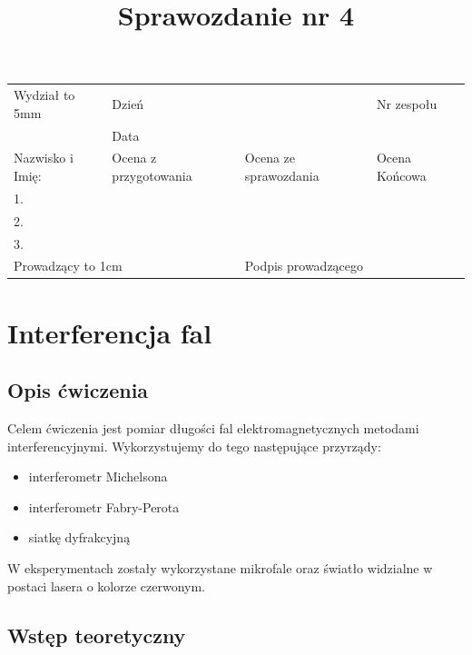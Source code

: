 \documentclass[a4paper]{article}
\title{Sprawozdanie nr 4}
\date{}
\newcommand{\Vsp}[1]{\vtop to #1 {}}
\newcommand{\Small}{\scriptsize}
\begin{document}
\begin{center}
\begin{tabular}{|p{5cm}|l|l|l|}
    \hline
    Wydział \Vsp{5mm} & \multicolumn{1}{|l}{Dzień} &  & Nr zespołu\\
    & \multicolumn{1}{|l}{Data} &  & \\
    \hline 
    Nazwisko i Imię: & \Small Ocena z przygotowania  & \Small Ocena ze sprawozdania & \Small Ocena Końcowa \\
    1. & & &\\
    2. & & & \\
    3. & & & \\
    \hline
    \multicolumn{2}{|l|}{Prowadzący \Vsp{1cm}} & \multicolumn{2}{|l|}{Podpis prowadzącego} \\
    \hline
\end{tabular}
\end{center}

{\let\newpage\relax\maketitle}  %
\setcounter{secnumdepth}{2}
\setcounter{tocdepth}{2}

\section{Interferencja fal} %

\subsection{Opis ćwiczenia}

Celem ćwiczenia jest pomiar długości fal elektromagnetycznych metodami interferencyjnymi.
Wykorzystujemy do tego następujące przyrządy:
\begin{itemize}
\item interferometr Michelsona
\item interferometr Fabry-Perota
\item siatkę dyfrakcyjną
\end{itemize}
W eksperymentach zostały wykorzystane mikrofale oraz światło widzialne w postaci lasera o kolorze czerwonym.

\subsection{Wstęp teoretyczny}
\end{document}
